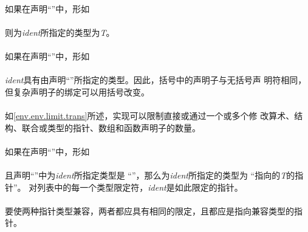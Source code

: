 {\paragraph{}
如果在声明``''中，形如                                        \\
\mbox{\hspace{4em}}                                            \\
则为\textit{ident}所指定的类型为\textit{T}。

\paragraph{}
如果在声明``''中，形如                                        \\
\mbox{\hspace{4em}\tm{(}  \tm{)}}                              \\
\textit{ident}具有由声明``''所指定的类型。因此，括号中的声明子与无括号声
明符相同，但复杂声明子的绑定可以用括号改变。

\implimit
\paragraph{}
如\ref{env.env.limit.trans}所述，实现可以限制直接或通过一个或多个修
改算术、结构、联合或类型的指针、数组和函数声明子的数量。


\semantic
\paragraph{}
如果在声明``''中，形如                                        \\
\mbox{\hspace{4em}\tm{*}  }           \\
且声明``''中为\textit{ident}所指定类型是
``''，那么为\textit{ident}所指定的类型为
``指向的\textit{T}的指针''。
对列表中的每一个类型限定符，\textit{ident}是如此限定的指针。

\paragraph{}
要使两种指针类型兼容，两者都应具有相同的限定，且都应是指向兼容类型的指针。

}
